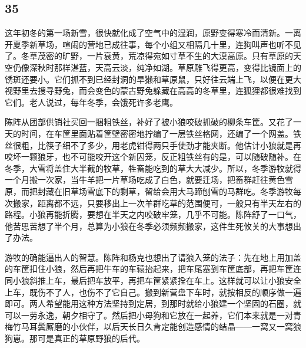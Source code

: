 \subsection*{35}




\par 这年初冬的第一场新雪，很快就化成了空气中的湿润，原野变得寒冷而清新。一离开夏季新草场，喧闹的营地已成往事，每个小组又相隔几十里，连狗叫声也听不见了。冬草茂密的旷野，一片衰黄，荒凉得宛如寸草不生的大漠高原。只有草原的天空仍像深秋时那样湛蓝，天高云淡，纯净如湖。草原雕飞得更高，变得比镜面上的锈斑还要小。它们抓不到已经封洞的旱獭和草原鼠，只好往云端上飞，以便在更大视野里去搜寻野兔，而会变色的蒙古野兔躲藏在高高的冬草里，连狐狸都很难找到它们。老人说过，每年冬季，会饿死许多老鹰。
\par 陈阵从团部供销社买回一捆粗铁丝，补好了被小狼咬破抓破的柳条车筐。又花了一天的时间，在车筐里面贴着筐壁密密地拧编了一层铁丝格网，还编了一个网盖。铁丝很粗，比筷子细不了多少，用老虎钳得两只手使劲才能夹断。他估计小狼就是再咬坏一颗狼牙，也不可能咬开这个新囚笼，反正粗铁丝有的是，可以随破随补。在冬季，大雪将盖住大半截的牧草，牲畜能吃到的草大大减少。所以，冬季游牧就得一个月搬一次家，当牛羊把一片草场吃成了白色，就要迁场，把畜群赶往黄色雪原，而把封藏在旧草场雪底下的剩草，留给会用大马蹄刨雪的马群吃。冬季游牧每次搬家，距离都不远，只要移出上一次羊群吃草的范围便可，一般只有半天左右的路程。小狼再能折腾，要想在半天之内咬破牢笼，几乎不可能。陈阵舒了一口气，他苦思苦想了半个月，总算为小狼在冬季必须频频搬家，这件生死攸关的大事想出了办法。
\par 游牧的确能逼出人的智慧。陈阵和杨克也想出了请狼入笼的法子：先在地上用加盖的车筐扣住小狼，然后再把牛车的车辕抬起来，把车尾塞到车筐底部，再把车筐连同小狼斜推上车，最后把车放平，再把车筐紧紧拴在车上。这样就可以让小狼安全上车，既伤不了人，也伤不了它自己。搬到新营盘下车时，就按相反的顺序做一遍即可。两人希望能用这种方法坚持到定居，到那时就给小狼建一个坚固的石圈，就可以一劳永逸，朝夕相守了。然后把小母狗和它放在一起养，它们本来就是一对青梅竹马耳鬓厮磨的小伙伴，以后天长日久肯定能创造感情的结晶——一窝又一窝狼狗崽。那可是真正的草原野狼的后代。
